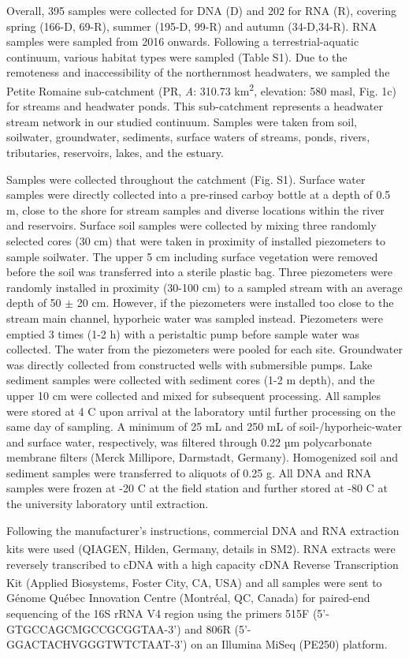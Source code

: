 \documentclass[12pt,a4paper]{article} %
\begin{document}
Overall, 395 samples were collected for DNA (D) and 202 for RNA (R), covering spring (166-D, 69-R), summer (195-D, 99-R) and autumn (34-D,34-R). RNA samples were sampled from 2016 onwards. Following a terrestrial-aquatic continuum, various habitat types were sampled (Table S1). Due to the remoteness and inaccessibility of the northernmost headwaters, we sampled the Petite Romaine sub-catchment (PR, \textit{A}: 310.73 km\textsuperscript{2}, elevation: 580 masl, Fig. 1c) for streams and headwater ponds. This sub-catchment represents a headwater stream network in our studied continuum. Samples were taken from soil, soilwater, groundwater, sediments, surface waters of streams, ponds, rivers, tributaries, reservoirs, lakes, and the estuary.

Samples were collected throughout the catchment (Fig. S1). Surface water samples were directly collected into a pre-rinsed carboy bottle at a depth of 0.5 m, close to the shore for stream samples and diverse locations within the river and reservoirs. Surface soil samples were collected by mixing three randomly selected cores (30 cm) that were taken in proximity of installed piezometers to sample soilwater. The upper 5 cm including surface vegetation were removed before the soil was transferred into a sterile plastic bag. Three piezometers were randomly installed in proximity (30-100 cm) to a sampled stream with an average depth of 50 $\pm$ 20 cm. However, if the piezometers were installed too close to the stream main channel, hyporheic water was sampled instead. Piezometers were emptied 3 times (1-2 h) with a peristaltic pump before sample water was collected. The water from the piezometers were pooled for each site. Groundwater was directly collected from constructed wells with submersible pumps. Lake sediment samples were collected with sediment cores (1-2 m depth), and the upper 10 cm were collected and mixed for subsequent processing. All samples were stored at 4 \textdegree{}C upon arrival at the laboratory until further processing on the same day of sampling. A minimum of 25 mL and 250 mL of soil-/hyporheic-water and surface water, respectively, was filtered through 0.22 µm polycarbonate membrane filters (Merck Millipore, Darmstadt, Germany). Homogenized soil and sediment samples were transferred to aliquots of 0.25 g. All DNA and RNA samples were frozen at -20 \textdegree{}C at the field station and further stored at -80 \textdegree{}C at the university laboratory until extraction.

Following the manufacturer's instructions, commercial DNA and RNA extraction kits were used (QIAGEN\textsuperscript{\textregistered}, Hilden, Germany, details in SM2). RNA extracts were reversely transcribed to cDNA with a high capacity cDNA Reverse Transcription Kit (Applied Biosystems\textsuperscript{\texttrademark}, Foster City, CA, USA) and all samples were sent to G\'{e}nome Qu\'{e}bec Innovation Centre (Montr\'{e}al, QC, Canada) for paired-end sequencing of the 16S rRNA V4 region using the primers 515F (5'-GTGCCAGCMGCCGCGGTAA-3') and 806R (5'-GGACTACHVGGGTWTCTAAT-3') on an Illumina MiSeq (PE250) platform.
\end{document}
